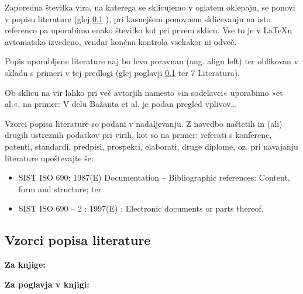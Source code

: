 Zaporedna številka vira, na katerega se sklicujemo v oglatem oklepaju, se 
ponovi v popisu literature (glej \ref{sec:vzorci_lit} 
), pri kasnejšem ponovnem sklicevanju na isto referenco 
pa uporabimo enako številko kot pri prvem sklicu. Vse to je v \LaTeX u 
avtomatsko izvedeno, vendar končna kontrola vsekakor ni odveč.

Popis uporabljene literature naj bo levo poravnan (ang. align left) ter 
oblikovan v skladu s primeri v tej predlogi (glej poglavji \ref{sec:vzorci_lit} 
 ter 7 Literatura).

Ob sklicu na vir lahko pri več avtorjih namesto »in sodelavci« uporabimo »et 
al.«, na primer: V delu Bažanta et al. \cite{bazant_1991} je podan pregled 
vplivov\ldots

Vzorci popisa literature so podani v nadaljevanju. Z navedbo naštetih in (ali) 
drugih ustreznih podatkov pri virih, kot so na primer: referati s konferenc, 
patenti, standardi, predpisi, prospekti, elaborati, druge diplome, oz. pri 
navajanju literature upoštevajte še:
\begin{itemize}
	\item SIST ISO 690: 1987(E) Documentation – Bibliographic references: 
	Content, form and structure; ter
	\item SIST ISO 690 – 2 : 1997(E) : Electronic documents or parts thereof.
\end{itemize}


\subsection{Vzorci popisa literature}\label{sec:vzorci_lit}

\textbf{Za knjige:}

\textbf{Za poglavja v knjigi:}

